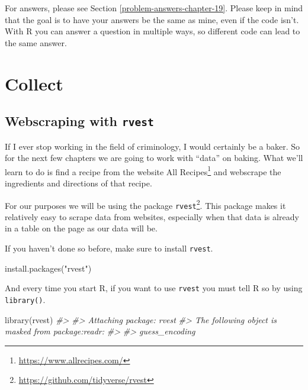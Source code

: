 \documentclass[
]{krantz}
\makeatletter
\newenvironment{Shaded}{\begin{snugshade}}{\end{snugshade}}
\newcommand{\CommentTok}[1]{\textcolor[rgb]{0.37,0.37,0.37}{\textit{#1}}}
\newcommand{\FunctionTok}[1]{\textcolor[rgb]{0,0,0}{#1}}
\newcommand{\NormalTok}[1]{#1}
\newcommand{\StringTok}[1]{\textcolor[rgb]{0.5,0.5,0.5}{#1}}
\renewcommand{\href}[2]{#2\footnote{\url{#1}}}
\newenvironment{kframe}{%
\medskip{}
\setlength{\fboxsep}{.8em}
 \def\at@end@of@kframe{}%
 \ifinner\ifhmode%
  \def\at@end@of@kframe{\end{minipage}}%
  \begin{minipage}{\columnwidth}%
 \fi\fi%
 \def\FrameCommand##1{\hskip\@totalleftmargin \hskip-\fboxsep
 \colorbox{shadecolor}{##1}\hskip-\fboxsep
     \hskip-\linewidth \hskip-\@totalleftmargin \hskip\columnwidth}%
 \MakeFramed {\advance\hsize-\width
   \@totalleftmargin\z@ \linewidth\hsize
   \@setminipage}}%
 {\par\unskip\endMakeFramed%
 \at@end@of@kframe}
\renewenvironment{Shaded}{\begin{kframe}}{\end{kframe}}
\makeatother
\begin{document}
For answers, please see Section \ref{problem-answers-chapter-19}. Please keep in mind that the goal is to have your answers be the same as mine, even if the code isn't. With R you can answer a question in multiple ways, so different code can lead to the same answer.

\hypertarget{part-collect}{%
\part{Collect}\label{part-collect}}

\hypertarget{webscraping-with-rvest}{%
\chapter{\texorpdfstring{Webscraping with \texttt{rvest}}{Webscraping with rvest}}\label{webscraping-with-rvest}}

If I ever stop working in the field of criminology, I would certainly be a baker. So for the next few chapters we are going to work with ``data'' on baking. What we'll learn to do is find a recipe from the website \href{https://www.allrecipes.com/}{All Recipes} and webscrape the ingredients and directions of that recipe.

For our purposes we will be using the package \href{https://github.com/tidyverse/rvest}{\texttt{rvest}}. This package makes it relatively easy to scrape data from websites, especially when that data is already in a table on the page as our data will be.

If you haven't done so before, make sure to install \texttt{rvest}.

\begin{Shaded}
\begin{Highlighting}[]
\FunctionTok{install.packages}\NormalTok{(}\StringTok{"rvest"}\NormalTok{)}
\end{Highlighting}
\end{Shaded}

And every time you start R, if you want to use \texttt{rvest} you must tell R so by using \texttt{library()}.

\begin{Shaded}
\begin{Highlighting}[]
\FunctionTok{library}\NormalTok{(rvest)}
\CommentTok{\#\textgreater{} }
\CommentTok{\#\textgreater{} Attaching package: \textquotesingle{}rvest\textquotesingle{}}
\CommentTok{\#\textgreater{} The following object is masked from \textquotesingle{}package:readr\textquotesingle{}:}
\CommentTok{\#\textgreater{} }
\CommentTok{\#\textgreater{}     guess\_encoding}
\end{Highlighting}
\end{Shaded}
\end{document}
